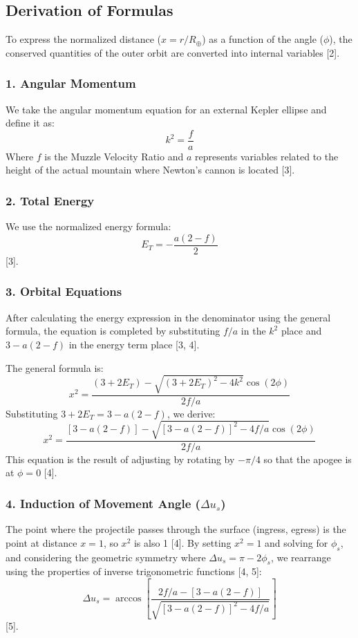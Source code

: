 \documentclass[11pt,letterpaper]{article}
\begin{document}
\subsection{Derivation of Formulas}

To express the normalized distance ($x=r/R_{\oplus}$) as a function of the angle ($\phi$), the conserved quantities of the outer orbit are converted into internal variables [2].

\subsubsection{1. Angular Momentum}
We take the angular momentum equation for an external Kepler ellipse and define it as:
\begin{equation}
    k^2 = \frac{f}{a}
\end{equation}
Where $f$ is the Muzzle Velocity Ratio and $a$ represents variables related to the height of the actual mountain where Newton's cannon is located [3].

\subsubsection{2. Total Energy}
We use the normalized energy formula:
\begin{equation}
    E_T = -\frac{a(2-f)}{2}
\end{equation}
[3].

\subsubsection{3. Orbital Equations}
After calculating the energy expression in the denominator using the general formula, the equation is completed by substituting $f/a$ in the $k^2$ place and $3-a(2-f)$ in the energy term place [3, 4].

The general formula is:
\begin{equation}
    x^2 = \frac{(3+2E_T) - \sqrt{(3+2E_T)^2 - 4k^2} \cos(2\phi)}{2f/a}
\end{equation}
Substituting $3+2E_T = 3-a(2-f)$, we derive:
\begin{equation}
    x^2 = \frac{[3-a(2-f)] - \sqrt{[3-a(2-f)]^2 - 4f/a} \cos(2\phi)}{2f/a}
\end{equation}
This equation is the result of adjusting by rotating by $-\pi/4$ so that the apogee is at $\phi = 0$ [4].

\subsubsection{4. Induction of Movement Angle ($\Delta u_s$)}
The point where the projectile passes through the surface (ingress, egress) is the point at distance $x=1$, so $x^2$ is also 1 [4]. By setting $x^2 = 1$ and solving for $\phi_s$, and considering the geometric symmetry where $\Delta u_s = \pi - 2\phi_s$, we rearrange using the properties of inverse trigonometric functions [4, 5]:
\begin{equation}
    \Delta u_s = \arccos \left[ \frac{2f/a - [3-a(2-f)]}{\sqrt{[3-a(2-f)]^2 - 4f/a}} \right]
\end{equation}
[5].
\end{document}

